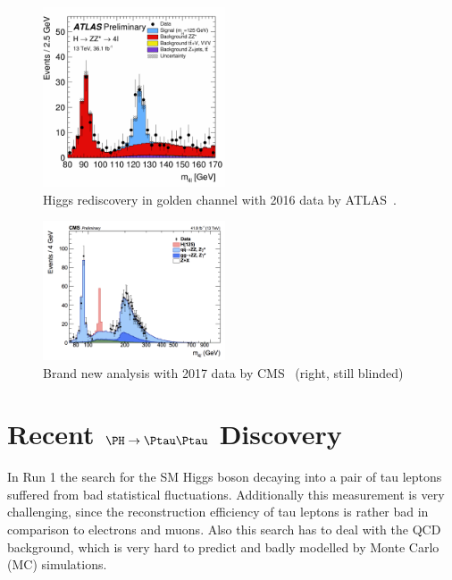 \begin{figure}[h]
\includegraphics[width=0.48\textwidth]{../plots/2016_goldenchannel.png}
\caption[Higgs boson rediscovery.]{Higgs rediscovery in golden channel with 2016 data by ATLAS~\cite{HiggsReDiscovery_ATLAS}.}
\label{figure_higgs_rediscovery_atlas}
\end{figure}

\begin{figure}[h]
\includegraphics[width=0.48\textwidth]{../plots/2017_goldenchannel}
\caption[Higgs boson rediscovery.]{Brand new analysis with 2017 data by CMS~\cite{HiggsReDiscovery_CMS} (right, still blinded)}
\label{figure_higgs_rediscovery_cms}
\end{figure}

\section{Recent $\PH \rightarrow \Ptau \Ptau$ Discovery \label{HTT}}

In Run 1 the search for the SM Higgs boson decaying into a pair of tau leptons suffered from bad statistical fluctuations. Additionally this measurement
is very challenging, since the reconstruction efficiency of tau leptons is rather bad in comparison to electrons and muons. Also this search has to deal with
the QCD background, which is very hard to predict and badly modelled by Monte Carlo (MC) simulations.

